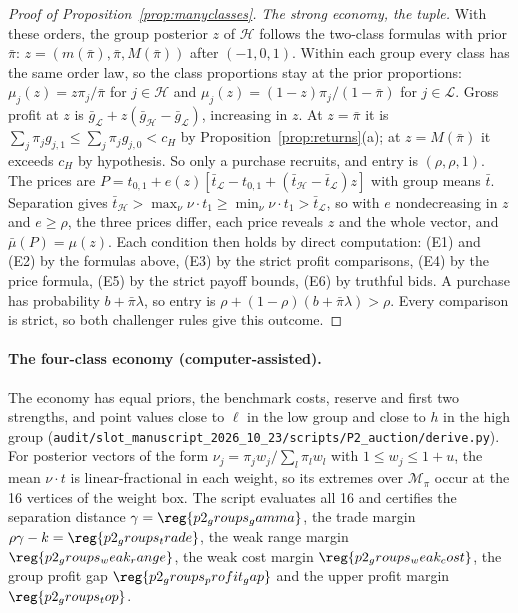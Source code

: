 \begin{proof}[Proof of Proposition~\ref{prop:manyclasses}]
\emph{The strong economy, the tuple.} With these orders, the group posterior \(z\) of \(\mathcal H\) follows the
two-class formulas with prior \(\bar\pi\): \(z=(m(\bar\pi),\bar\pi,M(\bar\pi))\) after \((-1,0,1)\). Within each
group every class has the same order law, so the class proportions stay at the prior proportions:
\(\mu_j(z)=z\pi_j/\bar\pi\) for \(j\in\mathcal H\) and \(\mu_j(z)=(1-z)\pi_j/(1-\bar\pi)\) for \(j\in\mathcal L\). Gross
profit at \(z\) is \(\bar g_{\mathcal L}+z(\bar g_{\mathcal H}-\bar g_{\mathcal L})\), increasing in \(z\). At
\(z=\bar\pi\) it is \(\sum_j\pi_jg_{j,1}\le\sum_j\pi_jg_{j,0}<c_H\) by Proposition~\ref{prop:returns}(a); at
\(z=M(\bar\pi)\) it exceeds \(c_H\) by hypothesis. So only a purchase recruits, and entry is \((\rho,\rho,1)\). The
prices are \(P=t_{0,1}+e(z)[\bar t_{\mathcal L}-t_{0,1}+(\bar t_{\mathcal H}-\bar t_{\mathcal L})z]\) with group means
\(\bar t\). Separation gives \(\bar t_{\mathcal H}>\max_{\nu}\nu\cdot t_1\ge\min_\nu\nu\cdot t_1>\bar t_{\mathcal L}\),
so with \(e\) nondecreasing in \(z\) and \(e\ge\rho\), the three prices differ, each price reveals \(z\) and the whole
vector, and \(\bar\mu(P)=\mu(z)\). Each condition then holds by direct computation: (E1) and (E2) by the formulas
above, (E3) by the strict profit comparisons, (E4) by the price formula, (E5) by the strict payoff bounds, (E6) by
truthful bids. A purchase has probability \(b+\bar\pi\lambda\), so entry is \(\rho+(1-\rho)(b+\bar\pi\lambda)>\rho\).
Every comparison is strict, so both challenger rules give this outcome.
\end{proof}

\paragraph{The four-class economy (computer-assisted).}
The economy has equal priors, the benchmark costs, reserve and first two strengths, and point values close to
\(\ell\) in the low group and close to \(h\) in the high group (\nolinkurl{audit/slot_manuscript_2026_10_23/scripts/P2_auction/derive.py}).
For posterior vectors of the form \(\nu_j=\pi_jw_j/\sum_l\pi_lw_l\) with \(1\le w_j\le1+u\), the mean \(\nu\cdot t\) is
linear-fractional in each weight, so its extremes over \(\mathcal M_\pi\) occur at the 16 vertices of the weight box.
The script evaluates all 16 and certifies the separation distance \(\gamma=\reg{p2_groups_gamma}\), the trade margin
\(\rho\gamma-k=\reg{p2_groups_trade}\), the weak range margin \(\reg{p2_groups_weak_range}\), the weak cost margin
\(\reg{p2_groups_weak_cost}\), the group profit gap \(\reg{p2_groups_profit_gap}\) and the upper profit margin
\(\reg{p2_groups_top}\).


